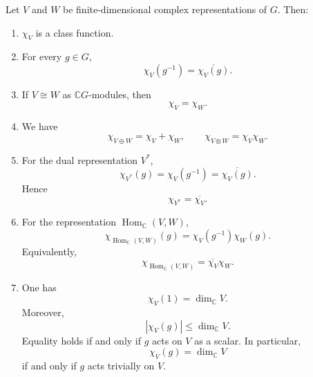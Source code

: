 \begin{proposition}
    Let \(V\) and \(W\) be finite-dimensional complex representations of \(G\).
    Then:

    \begin{enumerate}
        \item \(\chi_V\) is a class function.

        \item For every \(g\in G\),
              \[
                  \chi_V(g^{-1})=\overline{\chi_V(g)}.
              \]

        \item If \(V\cong W\) as \(\mathbb{C}G\)-modules, then
              \[
                  \chi_V=\chi_W.
              \]

        \item We have
              \[
                  \chi_{V\oplus W}=\chi_V+\chi_W,
                  \qquad
                  \chi_{V\otimes W}=\chi_V\chi_W.
              \]

        \item For the dual representation \(V^*\),
              \[
                  \chi_{V^*}(g)
                  =
                  \chi_V(g^{-1})
                  =
                  \overline{\chi_V(g)}.
              \]
              Hence
              \[
                  \chi_{V^*}=\overline{\chi_V}.
              \]

        \item For the representation \(\operatorname{Hom}_{\mathbb{C}}(V,W)\),
              \[
                  \chi_{\operatorname{Hom}_{\mathbb{C}}(V,W)}(g)
                  =
                  \chi_V(g^{-1})\chi_W(g).
              \]
              Equivalently,
              \[
                  \chi_{\operatorname{Hom}_{\mathbb{C}}(V,W)}
                  =
                  \overline{\chi_V}\chi_W.
              \]

        \item One has
              \[
                  \chi_V(1)=\dim_{\mathbb{C}}V.
              \]
              Moreover,
              \[
                  |\chi_V(g)|\leq \dim_{\mathbb{C}}V.
              \]
              Equality holds if and only if \(g\) acts on \(V\) as a scalar. In particular,
              \[
                  \chi_V(g)=\dim_{\mathbb{C}}V
              \]
              if and only if \(g\) acts trivially on \(V\).
    \end{enumerate}
\end{proposition}

